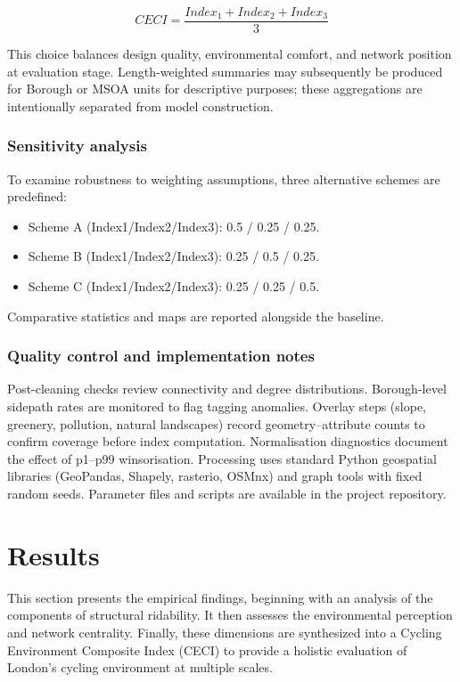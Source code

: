 \documentclass[
  12pt,
  oneside]{book}
\begin{document}
\[CECI = \frac{Index_{1} + Index_{2} + Index_{3}}{3}\]

This choice balances design quality, environmental comfort, and network position at evaluation stage. Length-weighted summaries may subsequently be produced for Borough or MSOA units for descriptive purposes; these aggregations are intentionally separated from model construction.

\subsection{Sensitivity analysis}\label{sensitivity-analysis}

To examine robustness to weighting assumptions, three alternative schemes are predefined:

\begin{itemize}
\item
  Scheme A (Index1/Index2/Index3): 0.5 / 0.25 / 0.25.
\item
  Scheme B (Index1/Index2/Index3): 0.25 / 0.5 / 0.25.
\item
  Scheme C (Index1/Index2/Index3): 0.25 / 0.25 / 0.5.
\end{itemize}

Comparative statistics and maps are reported alongside the baseline.

\subsection{Quality control and implementation notes}\label{quality-control-and-implementation-notes}

Post-cleaning checks review connectivity and degree distributions. Borough-level sidepath rates are monitored to flag tagging anomalies. Overlay steps (slope, greenery, pollution, natural landscapes) record geometry--attribute counts to confirm coverage before index computation. Normalisation diagnostics document the effect of p1--p99 winsorisation. Processing uses standard Python geospatial libraries (GeoPandas, Shapely, rasterio, OSMnx) and graph tools with fixed random seeds. Parameter files and scripts are available in the project repository.

\chapter{Results}\label{results}

This section presents the empirical findings, beginning with an analysis of the components of structural ridability. It then assesses the environmental perception and network centrality. Finally, these dimensions are synthesized into a Cycling Environment Composite Index (CECI) to provide a holistic evaluation of London's cycling environment at multiple scales.
\end{document}
